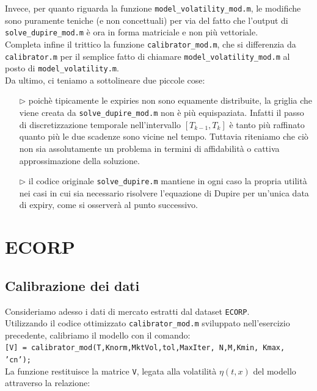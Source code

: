 \documentclass[11pt]{article}
\begin{document}
Invece, per quanto riguarda la funzione \texttt{model\_volatility\_mod.m}, le modifiche sono puramente teniche (e non concettuali) per via del fatto che l'output di \texttt{solve\_dupire\_mod.m} è ora in forma matriciale e non più vettoriale.\\

Completa infine il trittico la funzione \texttt{calibrator\_mod.m}, che si differenzia da \texttt{calibrator.m} per il semplice fatto di chiamare \texttt{model\_volatility\_mod.m} al posto di \texttt{model\_volatility.m}.\\

Da ultimo, ci teniamo a sottolineare due piccole cose:

\begin{itemize}
	\item[$\rhd$] poichè tipicamente le expiries non sono equamente distribuite, la griglia che viene creata da \texttt{solve\_dupire\_mod.m} non è più equispaziata. Infatti il passo di discretizzazione temporale nell'intervallo $[T_{k-1},T_k]$ è tanto più raffinato quanto più le due scadenze sono vicine nel tempo. Tuttavia riteniamo che ciò non sia assolutamente un problema in termini di affidabilità o cattiva approssimazione della soluzione.

	\item[$\rhd$] il codice originale \texttt{solve\_dupire.m} mantiene in ogni caso la propria utilità nei casi in cui sia necessario risolvere l'equazione di Dupire per un'unica data di expiry, come si osserverà al punto successivo.
\end{itemize}

\vfill
\section{ECORP}

\subsection{Calibrazione dei dati}
Consideriamo adesso i dati di mercato estratti dal dataset \texttt{ECORP}.\\
Utilizzando il codice ottimizzato \texttt{calibrator\_mod.m} sviluppato nell'esercizio precedente, calibriamo il modello con il comando:\\

\texttt{[V] = calibrator\_mod(T,Knorm,MktVol,tol,MaxIter, N,M,Kmin, Kmax, 'cn');}\\

La funzione restituisce la matrice \texttt{V}, legata alla volatilità $\eta(t,x)$ del modello attraverso la relazione:
\end{document}
